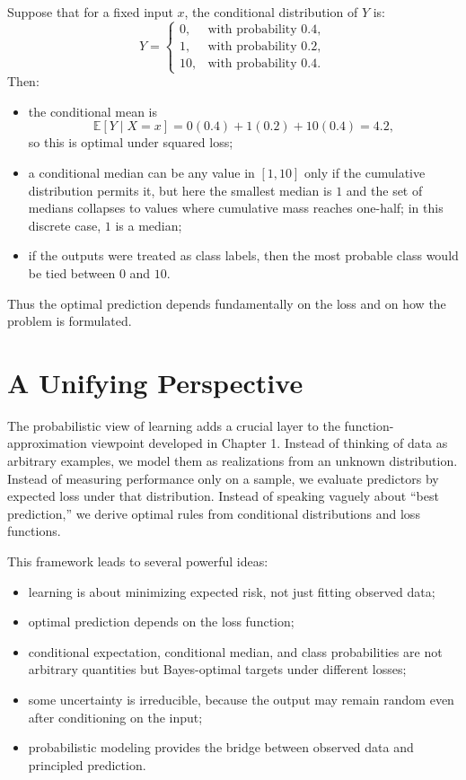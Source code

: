 \begin{example}
Suppose that for a fixed input $x$, the conditional distribution of $Y$ is:
\[
Y=
\begin{cases}
0, & \text{with probability } 0.4,\\
1, & \text{with probability } 0.2,\\
10, & \text{with probability } 0.4.
\end{cases}
\]
Then:
\begin{itemize}
    \item the conditional mean is
    \[
    \mathbb{E}[Y\mid X=x] = 0(0.4)+1(0.2)+10(0.4)=4.2,
    \]
    so this is optimal under squared loss;
    \item a conditional median can be any value in $[1,10]$ only if the cumulative distribution permits it, but here the smallest median is $1$ and the set of medians collapses to values where cumulative mass reaches one-half; in this discrete case, $1$ is a median;
    \item if the outputs were treated as class labels, then the most probable class would be tied between $0$ and $10$.
\end{itemize}
Thus the optimal prediction depends fundamentally on the loss and on how the problem is formulated.
\end{example}

\section{A Unifying Perspective}

The probabilistic view of learning adds a crucial layer to the function-approximation viewpoint developed in Chapter 1. Instead of thinking of data as arbitrary examples, we model them as realizations from an unknown distribution. Instead of measuring performance only on a sample, we evaluate predictors by expected loss under that distribution. Instead of speaking vaguely about ``best prediction,'' we derive optimal rules from conditional distributions and loss functions.

This framework leads to several powerful ideas:
\begin{itemize}
    \item learning is about minimizing expected risk, not just fitting observed data;
    \item optimal prediction depends on the loss function;
    \item conditional expectation, conditional median, and class probabilities are not arbitrary quantities but Bayes-optimal targets under different losses;
    \item some uncertainty is irreducible, because the output may remain random even after conditioning on the input;
    \item probabilistic modeling provides the bridge between observed data and principled prediction.
\end{itemize}

